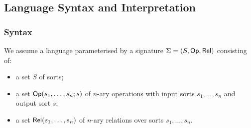 \subsection{Language Syntax and Interpretation}

\subsubsection{Syntax}

We assume a language parameterised by a signature $\Sigma = (S, \mathsf{Op}, \mathsf{Rel})$ consisting of:
\begin{itemize}
\item a set $S$ of sorts;
\item a set $\mathsf{Op}(s_1, \ldots, s_n; s)$ of $n$-ary operations with input sorts $s_1, \ldots, s_n$ and output
sort $s$;
\item a set $\mathsf{Rel}(s_1, \ldots, s_n)$ of $n$-ary relations over sorts $s_1, \ldots, s_n$.
\end{itemize}

\noindent {}



%
